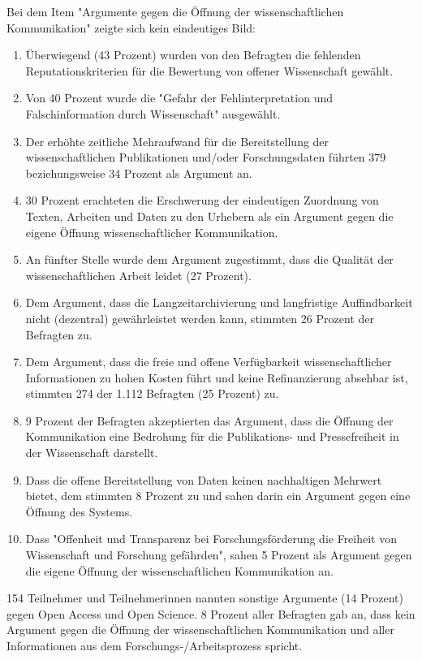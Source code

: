 Bei dem Item "Argumente gegen die Öffnung der wissenschaftlichen Kommunikation" zeigte sich kein eindeutiges Bild:
\begin{enumerate}
\item Überwiegend (43 Prozent) wurden von den Befragten die fehlenden Reputationskriterien für die Bewertung von offener Wissenschaft gewählt.
\item Von 40 Prozent wurde die "Gefahr der Fehlinterpretation und Falschinformation durch Wissenschaft" ausgewählt.
\item Der erhöhte zeitliche Mehraufwand für die Bereitstellung der wissenschaftlichen Publikationen und/oder Forschungsdaten führten 379 beziehungsweise 34 Prozent als Argument an.
\item 30 Prozent erachteten die Erschwerung der eindeutigen Zuordnung von Texten, Arbeiten und Daten zu den Urhebern als ein Argument gegen die eigene Öffnung wissenschaftlicher Kommunikation.
\item An fünfter Stelle wurde dem Argument zugestimmt, dass die Qualität der wissenschaftlichen Arbeit leidet (27 Prozent).
\item Dem Argument, dass die Langzeitarchivierung und langfristige Auffindbarkeit nicht (dezentral) gewährleistet werden kann, stimmten 26 Prozent der Befragten zu.
\item Dem Argument, dass die freie und offene Verfügbarkeit wissenschaftlicher Informationen zu hohen Kosten führt und keine Refinanzierung absehbar ist, stimmten 274 der 1.112 Befragten (25 Prozent) zu.
\item 9 Prozent der Befragten akzeptierten das Argument, dass die Öffnung der Kommunikation eine Bedrohung für die Publikations- und Pressefreiheit in der Wissenschaft darstellt.
\item Dass die offene Bereitstellung von Daten keinen nachhaltigen Mehrwert bietet, dem stimmten 8 Prozent zu und sahen darin ein Argument gegen eine Öffnung des Systems.
\item Dass "Offenheit und Transparenz bei Forschungsförderung die Freiheit von Wissenschaft und Forschung gefährden", sahen 5 Prozent als Argument gegen die eigene Öffnung der wissenschaftlichen Kommunikation an.
\end{enumerate}

154 Teilnehmer und Teilnehmerinnen nannten sonstige Argumente (14 Prozent) gegen Open Access und Open Science. 8 Prozent aller Befragten gab an, dass kein Argument gegen die Öffnung der wissenschaftlichen Kommunikation und aller Informationen aus dem Forschungs-/Arbeitsprozess spricht.

